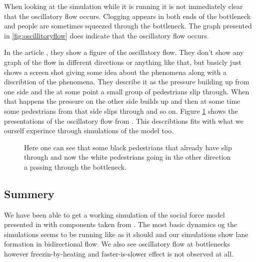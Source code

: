 When looking at the simulation while it is running it is not
immediately clear that the oscillatory flow occurs. Clogging
appears in both ends of the bottleneck and people are sometimes
squeezed through the bottleneck. The graph presented in
\ref{fig:oscillitoryflow} does indicate that the oscillatory
flow occurs.

In the article \cite{oscil}, they show a figure of the oscillatory flow. They don't show any graph of the flow in different directions or anything like that, but basicly just shows a screen shot giving some idea about the phenomena along with a discribtion of the phenomena. They describe it as the pressure building up from one side and the at some point a small group of pedestrians slip through. When that happens the pressure on the other side builds up and then at some time some pedestrians from that side slips through and so on. Figure \ref{fig:oscillitoryflow_litterature} shows the presentations of the oscillatory flow from \cite{oscil}. This describtions fits with what we ourself experince through simulations of the model too.
\begin{figure}[h]
\centering
{}
\caption{Here one can see that some black pedestrians that already have slip through and now the white pedestrians going in the other direction a passing through the bottleneck.}
\label{fig:oscillitoryflow_litterature}
\end{figure}


\subsection{Summery}
We have been able to get a working simulation of the social force model 
presented in \cite{self-org} with components taken from \cite{ABconstant}. 
The most basic dynamics og the simulations seems to be running like as it 
should and our simulations show lane formation in bidirectional flow. We also  
see oscillatory flow at bottlenecks however freezin-by-heating 
and faster-is-slower effect is not observed at all.
